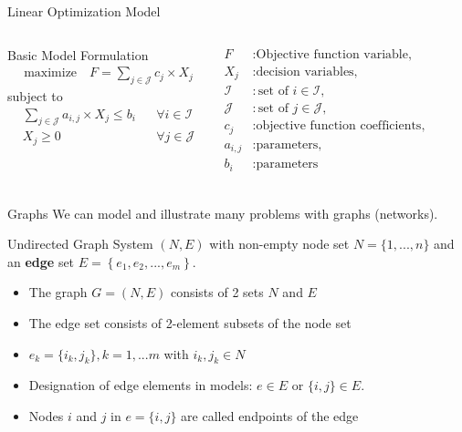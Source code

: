 \documentclass[aspectratio=1610,12pt]{beamer}
\begin{document}
\begin{frame}{Linear Optimization Model}
	\begin{columns}[onlytextwidth]
		\begin{block}{Basic Model Formulation}
			\begin{align}
   				&\text{maximize} \quad F = \sum_{j\in \mathcal{J}} c_j \times X_j
   			\end{align}
   			\quad subject to
   			\begin{align}
  				&\sum_{j\in \mathcal{J}} a_{i,j} \times X_j  \le b_i && \forall i \in \mathcal{I} \\
   				&X_j \ge 0 &&  \forall  j \in \mathcal{J} 
			\end{align}
			\vspace{0.1cm}
		\end{block}
				\begin{align*}
   			 		F 	&: \text{Objective function variable,}\\
   			 		X_{j}	&: \text{decision variables,}\\
   			 		\mathcal{I} &: \text{set of $i \in \mathcal{I}$,}\\
   			 		\mathcal{J} &: \text{set of $j \in \mathcal{J}$,}\\
   			 		c_{j}	&: \text{objective function coefficients,}\\
    				a_{i,j}	&: \text{parameters,}\\
    				b_{i}	&: \text{parameters}\\
				\end{align*}
	\end{columns}
\end{frame}

\begin{frame}{Graphs}
We can model and illustrate many problems with graphs (networks).
\begin{block}{Undirected Graph}
\vspace{0.15cm}
System $(N,E)$ with non-empty node set $N = \{1,...,n \}$ and
an \textbf{edge} set $E = \left\{e_1,e_2,...,e_m \right\}$.
\end{block}
\begin{itemize}
	\item The graph $G=(N,E)$ consists of 2 sets $N$ and $E$
	\item The edge set consists of 2-element subsets of the node set
	\item $e_k = \{i_k,j_k \}, k=1,...m$ with $i_k,j_k \in N$
	\item Designation of edge elements in models: $e \in E$ or $\{i,j\}\in E$.
	\item Nodes $i$ and $j$ in $e=\{i,j\}$ are called endpoints of the edge
\end{itemize}
\end{frame}
\end{document}

